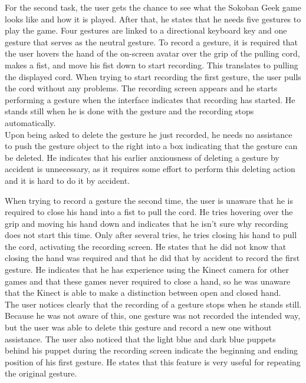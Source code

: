 For the second task, the user gets the chance to see what the Sokoban Geek game looks like and how it is played. After that, he states that he needs five gestures to play the game. Four gestures are linked to a directional keyboard key and one gesture that serves as the neutral gesture. To record a gesture, it is required that the user hovers the hand of the on-screen avatar over the grip of the pulling cord, makes a fist, and move his fist down to start recording. This translates to pulling the displayed cord. When trying to start recording the first gesture, the user pulls the cord without any problems. The recording screen appears and he starts performing a gesture when the interface indicates that recording has started. He stands still when he is done with the gesture and the recording stops automatically.\\

Upon being asked to delete the gesture he just recorded, he needs no assistance to push the gesture object to the right into a box indicating that the gesture can be deleted. He indicates that his earlier anxiousness of deleting a gesture by accident is unnecessary, as it requires some effort to perform this deleting action and it is hard to do it by accident.\\

\newpage

When trying to record a gesture the second time, the user is unaware that he is required to close his hand into a fist to pull the cord. He tries hovering over the grip and moving his hand down and indicates that he isn't sure why recording does not start this time. Only after several tries, he tries closing his hand to pull the cord, activating the recording screen. He states that he did not know that closing the hand was required and that he did that by accident to record the first gesture. He indicates that he has experience using the Kinect camera for other games and that these games never required to close a hand, so he was unaware that the Kinect is able to make a distinction between open and closed hand.\\

The user notices clearly that the recording of a gesture stops when he stands still. Because he was not aware of this, one gesture was not recorded the intended way, but the user was able to delete this gesture and record a new one without assistance. The user also noticed that the light blue and dark blue puppets behind his puppet during the recording screen indicate the beginning and ending position of his first gesture. He states that this feature is very useful for repeating the original gesture.\\

